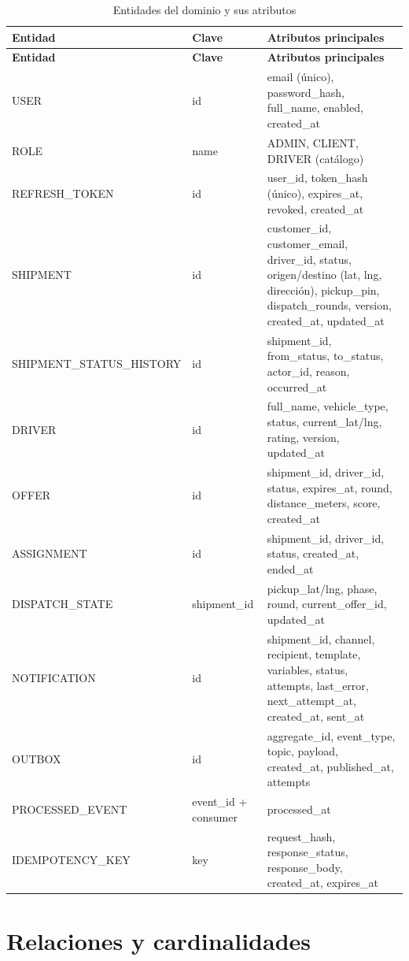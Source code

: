 \documentclass[10pt,letterpaper,twocolumn,oneside]{report}
\begin{document}
\begin{longtable}{@{}L{4.6cm}L{2.2cm}L{7.2cm}@{}}
\caption{Entidades del dominio y sus atributos}\label{tab:entidades}\\
\toprule
\textbf{Entidad} & \textbf{Clave} & \textbf{Atributos principales}\\
\midrule
\endfirsthead
\toprule
\textbf{Entidad} & \textbf{Clave} & \textbf{Atributos principales}\\
\midrule
\endhead
USER & id & email (único), password\_hash, full\_name, enabled, created\_at\\
ROLE & name & ADMIN, CLIENT, DRIVER (catálogo)\\
REFRESH\_TOKEN & id & user\_id, token\_hash (único), expires\_at, revoked, created\_at\\
SHIPMENT & id & customer\_id, customer\_email, driver\_id, status, origen/destino (lat, lng,
dirección), pickup\_pin, dispatch\_rounds, version, created\_at, updated\_at\\
SHIPMENT\_STATUS\_HISTORY & id & shipment\_id, from\_status, to\_status, actor\_id, reason, occurred\_at\\
DRIVER & id & full\_name, vehicle\_type, status, current\_lat/lng, rating, version, updated\_at\\
OFFER & id & shipment\_id, driver\_id, status, expires\_at, round, distance\_meters, score, created\_at\\
ASSIGNMENT & id & shipment\_id, driver\_id, status, created\_at, ended\_at\\
DISPATCH\_STATE & shipment\_id & pickup\_lat/lng, phase, round, current\_offer\_id, updated\_at\\
NOTIFICATION & id & shipment\_id, channel, recipient, template, variables, status, attempts,
last\_error, next\_attempt\_at, created\_at, sent\_at\\
OUTBOX & id & aggregate\_id, event\_type, topic, payload, created\_at, published\_at, attempts\\
PROCESSED\_EVENT & event\_id + consumer & processed\_at\\
IDEMPOTENCY\_KEY & key & request\_hash, response\_status, response\_body, created\_at, expires\_at\\
\bottomrule
\end{longtable}

\section{Relaciones y cardinalidades}
\end{document}

